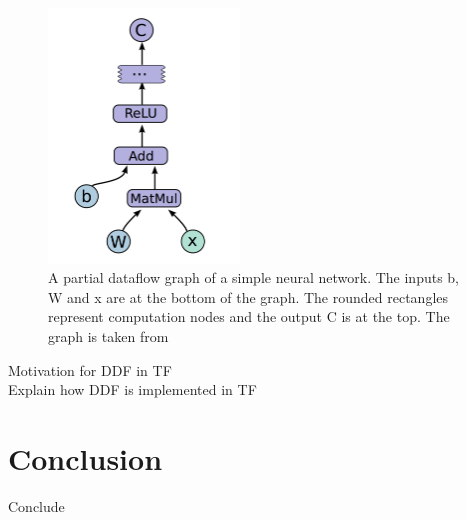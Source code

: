 \documentclass[conference,a4paper]{IEEEtran}
\begin{document}
\begin{figure}[!t]
    \centering
    \includegraphics[width=12pc]{tf_simple_neural.png}
        \caption{A partial dataflow graph of a simple neural network. The inputs
        b, W and x are at the bottom of the graph. The rounded rectangles
        represent computation nodes and the output C is at the top. The graph is
        taken from \cite{tensorflow2015-whitepaper}}
        \label{fig:simple_tf}
\end{figure}

Motivation for DDF in TF \\
Explain how DDF is implemented in TF \\

\section{Conclusion}
Conclude \\



\end{document}
